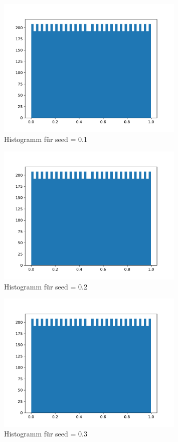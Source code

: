 \begin{figure}[H]
  \centering
  \includegraphics[width=0.8\textwidth]{nr8_c_seed=0.1.pdf}
  \caption{Histogramm für seed = 0.1}
\end{figure}

\begin{figure}[H]
  \centering
  \includegraphics[width=0.8\textwidth]{nr8_c_seed=0.2.pdf}
  \caption{Histogramm für seed = 0.2}
\end{figure}

\begin{figure}[H]
  \centering
  \includegraphics[width=0.8\textwidth]{nr8_c_seed=0.3.pdf}
  \caption{Histogramm für seed = 0.3}
\end{figure}


